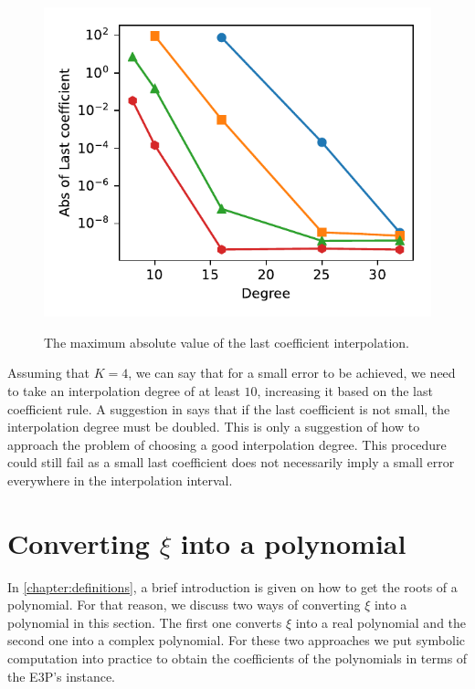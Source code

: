 \begin{figure}
	\centering
	\caption{The maximum absolute value of the last coefficient interpolation.}
	\includegraphics[scale=.9]{tex/figures/last_coeff}
	\fautor
	\label{fig:last-coeff}
\end{figure}

Assuming that $K=4$, we can say that for a small error to be achieved, we need to take an interpolation degree of at least $10$, increasing it based on the last coefficient rule. A suggestion in  says that if the last coefficient is not small, the interpolation degree must be doubled. 
This is only a suggestion of how to approach the problem of choosing a good interpolation degree. 
This procedure could still fail as a small last coefficient does not necessarily imply a small error everywhere in the interpolation interval. 

\section{Converting $\xi$ into a polynomial}

In \autoref{chapter:definitions}, a brief introduction is given on how to get the roots of a polynomial. For that reason, we discuss two ways of converting $\xi$ into a polynomial in this section. The first one converts $\xi$ into a real polynomial and the second one into a complex polynomial. For these two approaches we put symbolic computation into practice to obtain the coefficients of the polynomials in terms of the E3P's instance. 

